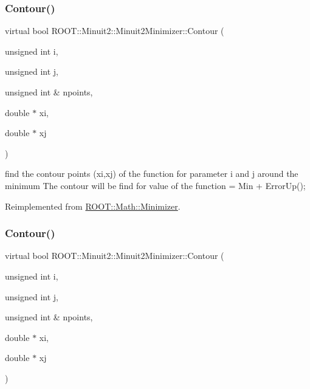 \subsubsection{\texorpdfstring{Contour()}{Contour()}\hspace{0.1cm}{\footnotesize\ttfamily [1/3]}}
{\footnotesize\ttfamily virtual bool R\+O\+O\+T\+::\+Minuit2\+::\+Minuit2\+Minimizer\+::\+Contour (\begin{DoxyParamCaption}\item[{unsigned int}]{i,  }\item[{unsigned int}]{j,  }\item[{unsigned int \&}]{npoints,  }\item[{double $\ast$}]{xi,  }\item[{double $\ast$}]{xj }\end{DoxyParamCaption})\hspace{0.3cm}{\ttfamily [virtual]}}

find the contour points (xi,xj) of the function for parameter i and j around the minimum The contour will be find for value of the function = Min + Error\+Up(); 

Reimplemented from \mbox{\hyperlink{classROOT_1_1Math_1_1Minimizer_aeb8855190ff2e37911c38ed839f2043c}{R\+O\+O\+T\+::\+Math\+::\+Minimizer}}.

\mbox{\label{classROOT_1_1Minuit2_1_1Minuit2Minimizer_a026780c27dd4b179817f826f49e36c8e}} 
\subsubsection{\texorpdfstring{Contour()}{Contour()}\hspace{0.1cm}{\footnotesize\ttfamily [2/3]}}
{\footnotesize\ttfamily virtual bool R\+O\+O\+T\+::\+Minuit2\+::\+Minuit2\+Minimizer\+::\+Contour (\begin{DoxyParamCaption}\item[{unsigned int}]{i,  }\item[{unsigned int}]{j,  }\item[{unsigned int \&}]{npoints,  }\item[{double $\ast$}]{xi,  }\item[{double $\ast$}]{xj }\end{DoxyParamCaption})\hspace{0.3cm}{\ttfamily [virtual]}}

